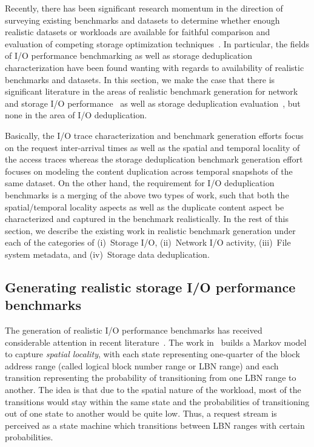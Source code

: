 Recently, there has been significant research momentum in the direction
of surveying existing benchmarks and datasets to determine whether
enough realistic datasets or workloads are available for faithful
comparison and evaluation of competing storage optimization 
techniques~\cite{generating-datasets}.
In particular, the fields of I/O performance benchmarking as well as
storage deduplication characterization have been found wanting
with regards to availability of realistic benchmarks and datasets.
In this section, we make the case that there is significant
literature in the areas of realistic benchmark generation for 
network~\cite{echo} and 
storage I/O performance~\cite{storagecharacterization, storagemodeling,
storagereplay, flexi-replay, decoupling-dc-studies,
case-for-nas-benchmarks, jump-based-synthetic, distiller} as well as storage deduplication
evaluation~\cite{generating-datasets}, but none in the area of I/O deduplication. 

Basically, 
the I/O trace characterization and benchmark generation efforts 
focus on the request inter-arrival times as well as the spatial
and temporal locality of the access traces whereas the storage
deduplication benchmark generation effort focuses on modeling
the content duplication across temporal snapshots of the same
dataset. On the other hand, the requirement for I/O deduplication
benchmarks is a merging of the above two types of work, such 
that both the spatial/temporal locality aspects as well as
the duplicate content aspect be characterized and captured 
in the benchmark realistically. In the rest of this section,
we describe the existing work in realistic benchmark generation
under each of the categories of (i)~Storage I/O, 
(ii)~Network I/O activity, 
(iii)~File system metadata,
and
(iv)~Storage data deduplication.




\subsection{Generating realistic storage I/O performance benchmarks}
The generation of realistic I/O performance benchmarks
has received considerable attention in recent literature~\cite{storagecharacterization, storagemodeling,
storagereplay, flexi-replay, decoupling-dc-studies,
jump-based-synthetic, distiller}. 
The work in~\cite{storagecharacterization}
builds a Markov model to capture \textit{spatial locality},
with each state representing one-quarter of the 
block address range (called logical block number range or LBN range) 
and each transition representing
the probability of transitioning from one LBN range to another. The idea
is that due to the spatial nature of the workload, most of the
transitions would stay within the same state and the probabilities
of transitioning out of one state to another would be quite low. 
Thus, a request stream is perceived as a state machine 
which transitions between LBN ranges with certain probabilities.


